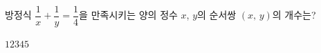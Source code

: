 방정식 $\dfrac{1}{x}+\dfrac{1}{y}=\dfrac{1}{4}$을 만족시키는 양의 정수 $x$, $y$의 순서쌍 $(x,\,y)$의 개수는?
\begin{choices32}{$1$}{$2$}{$3$}{$4$}{$5$}\end{choices32}
